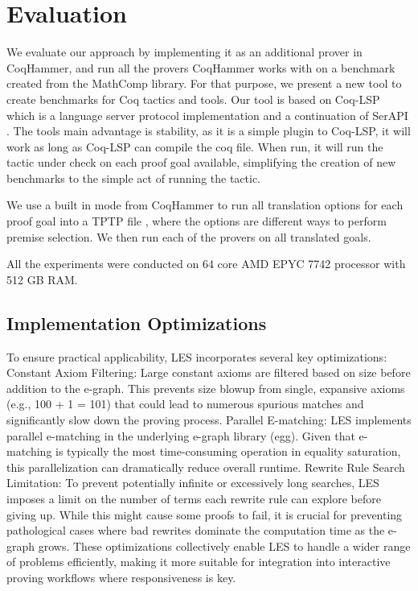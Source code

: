 \section{Evaluation}
\label{les:eval}

We evaluate our approach by implementing it as an additional prover in CoqHammer, and run all the provers CoqHammer works with on a benchmark created from the MathComp library.
For that purpose, we present a new tool to create benchmarks for Coq tactics and tools.
Our tool is based on Coq-LSP which is a language server protocol implementation and a continuation of SerAPI \cite{serapi}.
The tools main advantage is stability, as it is a simple plugin to Coq-LSP, it will work as long as Coq-LSP can compile the coq file. 
When run, it will run the tactic under check on each proof goal available, simplifying the creation of new benchmarks to the simple act of running the tactic.

We use a built in mode from CoqHammer to run all translation options for each proof goal into a TPTP file \cite{sutcliffe2017tptp}, where the options are different ways to perform premise selection.
We then run each of the provers on all translated goals.

All the experiments were conducted on 64 core AMD EPYC 7742 processor with 512 GB RAM.

\subsection{Implementation Optimizations}

To ensure practical applicability, LES incorporates several key optimizations:
Constant Axiom Filtering: Large constant axioms are filtered based on size before addition to the e-graph. This prevents size blowup from single, expansive axioms (e.g., 100 + 1 = 101) that could lead to numerous spurious matches and significantly slow down the proving process.
Parallel E-matching: LES implements parallel e-matching in the underlying e-graph library (egg). Given that e-matching is typically the most time-consuming operation in equality saturation, this parallelization can dramatically reduce overall runtime.
Rewrite Rule Search Limitation: To prevent potentially infinite or excessively long searches, LES imposes a limit on the number of terms each rewrite rule can explore before giving up. While this might cause some proofs to fail, it is crucial for preventing pathological cases where bad rewrites dominate the computation time as the e-graph grows.
These optimizations collectively enable LES to handle a wider range of problems efficiently, making it more suitable for integration into interactive proving workflows where responsiveness is key.
